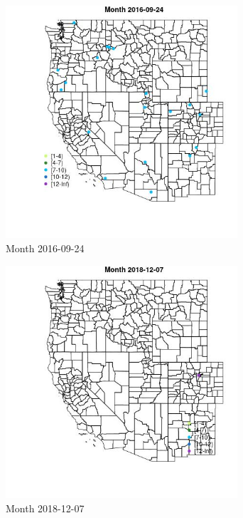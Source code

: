 \begin{figure} 
\centering  
\includegraphics[width=0.77\textwidth]{Code_Outputs/Report_ML_input_PM25_Step4_part_e_de_duplicated_aves_MapObsMonth2016-09-24.jpg} 
\caption{\label{fig:Report_ML_input_PM25_Step4_part_e_de_duplicated_avesMapObsMonth2016-09-24}Month 2016-09-24} 
\end{figure} 
 

\clearpage 

\begin{figure} 
\centering  
\includegraphics[width=0.77\textwidth]{Code_Outputs/Report_ML_input_PM25_Step4_part_e_de_duplicated_aves_MapObsMonth2018-12-07.jpg} 
\caption{\label{fig:Report_ML_input_PM25_Step4_part_e_de_duplicated_avesMapObsMonth2018-12-07}Month 2018-12-07} 
\end{figure} 
 


